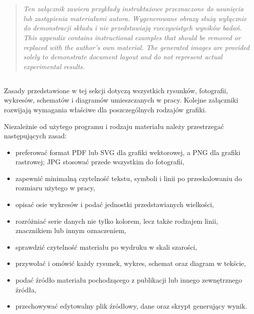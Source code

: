 \chapter{}
\label{app:rysunki}

\begin{quote}
\itshape
\ploren
  {Ten załącznik zawiera przykłady instruktażowe przeznaczone do usunięcia lub zastąpienia materiałami autora. Wygenerowane obrazy służą wyłącznie do demonstracji składu i nie przedstawiają rzeczywistych wyników badań.}
  {This appendix contains instructional examples that should be removed or replaced with the author's own material. The generated images are provided solely to demonstrate document layout and do not represent actual experimental results.}
\end{quote}

\section{}

Zasady przedstawione w tej sekcji dotyczą wszystkich rysunków, fotografii, wykresów, schematów i diagramów umieszczanych w pracy. Kolejne załączniki rozwijają wymagania właściwe dla poszczególnych rodzajów grafiki.

Niezależnie od użytego programu i rodzaju materiału należy przestrzegać następujących zasad:

\begin{itemize}
  \item preferować format PDF lub SVG dla grafiki wektorowej, a PNG dla grafiki rastrowej; JPG stosować przede wszystkim do fotografii,
  \item zapewnić minimalną czytelność tekstu, symboli i linii po przeskalowaniu do rozmiaru użytego w pracy,
  \item opisać osie wykresów i podać jednostki przedstawianych wielkości,
  \item rozróżniać serie danych nie tylko kolorem, lecz także rodzajem linii, znacznikiem lub innym oznaczeniem,
  \item sprawdzić czytelność materiału po wydruku w skali szarości,
  \item przywołać i omówić każdy rysunek, wykres, schemat oraz diagram w tekście,
  \item podać źródło materiału pochodzącego z publikacji lub innego zewnętrznego źródła,
  \item przechowywać edytowalny plik źródłowy, dane oraz skrypt generujący wynik.
\end{itemize}

